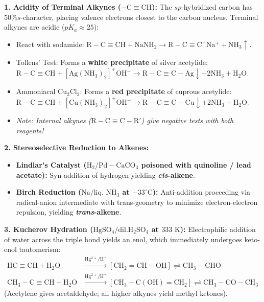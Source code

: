 \documentclass[10pt,twoside,openright]{book}
\begin{document}
\begin{conceptbox}
\textbf{1. Acidity of Terminal Alkynes ($-\mathrm{C\equiv CH}$):}
The $sp$-hybridized carbon has $50\% s$-character, placing valence electrons closest to the carbon nucleus. Terminal alkynes are acidic ($pK_a \approx 25$):
\begin{itemize}
  \item React with sodamide: $\mathrm{R-C\equiv CH} + \mathrm{NaNH_2} \to \mathrm{R-C\equiv C^-Na^+} + \mathrm{NH_3}\uparrow$.
  \item Tollens' Test: Forms a \textbf{white precipitate} of silver acetylide: $\mathrm{R-C\equiv CH} + \mathrm{[Ag(NH_3)_2]^+OH^-} \to \mathrm{R-C\equiv C-Ag}\downarrow + 2\mathrm{NH_3} + \mathrm{H_2O}$.
  \item Ammoniacal $\mathrm{Cu_2Cl_2}$: Forms a \textbf{red precipitate} of cuprous acetylide: $\mathrm{R-C\equiv CH} + \mathrm{[Cu(NH_3)_2]^+OH^-} \to \mathrm{R-C\equiv C-Cu}\downarrow + 2\mathrm{NH_3} + \mathrm{H_2O}$.
  \item \textit{Note: Internal alkynes ($\mathrm{R-C\equiv C-R'}$) give negative tests with both reagents!}
\end{itemize}
\textbf{2. Stereoselective Reduction to Alkenes:}
\begin{itemize}
  \item \textbf{Lindlar's Catalyst ($\mathrm{H_2 / Pd-CaCO_3}$ poisoned with quinoline / lead acetate):} Syn-addition of hydrogen yielding \textbf{\textit{cis}-alkene}.
  \item \textbf{Birch Reduction ($\mathrm{Na / \text{liq. } NH_3}$ at $-33^\circ\text{C}$):} Anti-addition proceeding via radical-anion intermediate with trans-geometry to minimize electron-electron repulsion, yielding \textbf{\textit{trans}-alkene}.
\end{itemize}
\textbf{3. Kucherov Hydration ($\mathrm{HgSO_4 / dil. H_2SO_4}$ at $333\text{ K}$):}
Electrophilic addition of water across the triple bond yields an enol, which immediately undergoes keto-enol tautomerism:
\begin{align}
  \mathrm{HC\equiv CH} + \mathrm{H_2O} &\xrightarrow{\mathrm{Hg^{2+}/H^+}} [\mathrm{CH_2=CH-OH}] \rightleftharpoons \mathbf{\mathrm{CH_3-CHO}} \\
  \mathrm{CH_3-C\equiv CH} + \mathrm{H_2O} &\xrightarrow{\mathrm{Hg^{2+}/H^+}} [\mathrm{CH_3-C(OH)=CH_2}] \rightleftharpoons \mathbf{\mathrm{CH_3-CO-CH_3}}
\end{align}
(Acetylene gives acetaldehyde; all higher alkynes yield methyl ketones).
\end{conceptbox}
\end{document}
